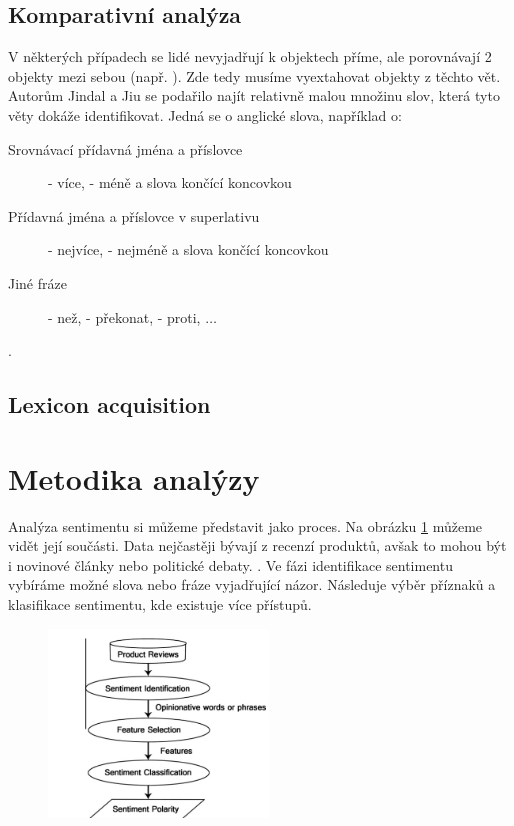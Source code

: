 \subsection{Komparativní analýza}
V některých případech se lidé nevyjadřují k objektech příme, ale porovnávají 2 objekty mezi sebou (např. ). Zde tedy musíme vyextahovat objekty z těchto vět. Autorům Jindal a Jiu se podařilo najít relativně malou množinu slov, která tyto věty dokáže identifikovat. \cite{comparative} Jedná se o anglické slova, například o: \cite{comparative} 
\begin{description}
	\item[Srovnávací přídavná jména a příslovce]  - více,  - méně a slova končící koncovkou 

	\item[Přídavná jména a příslovce v superlativu]   - nejvíce,  - nejméně a slova končící koncovkou 
	
	\item[Jiné fráze]  - než,  - překonat,  - proti, $\dots$
\end{description}
. \cite[překlad vlastní]{comparative}


\subsection{Lexicon acquisition}
\blind[2]
		
\section{Metodika analýzy}

Analýza sentimentu si můžeme představit jako proces. Na obrázku \ref{fig:SAprocess} můžeme vidět její součásti. Data nejčastěji bývají z recenzí produktů, avšak to mohou být i novinové články nebo politické debaty. \cite[překlad vlastní]{Medhat}. Ve fázi identifikace sentimentu vybíráme možné slova nebo fráze vyjadřující názor. Následuje výběr příznaků a klasifikace sentimentu, kde existuje více přístupů. \cite[překlad vlastní]{Medhat} 


\begin{figure}[h]
    \centering
    \includegraphics[height=5cm]{text/img/SAProcess.PNG}
    \caption{}
    \label{fig:SAprocess}
\end{figure}

